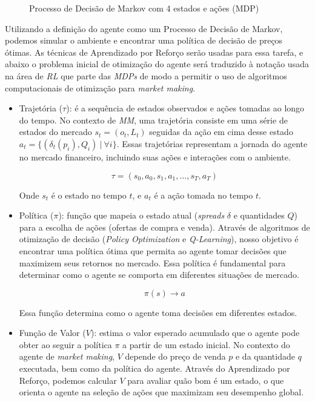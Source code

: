 \begin{figure}[H]
	\centering
	
	\caption{Processo de Decisão de Markov com 4 estados e ações (MDP)}
	\label{fig:mdp}
\end{figure}

Utilizando a definição do agente como um Processo de Decisão de Markov, podemos simular o ambiente e encontrar uma política de decisão de preços ótimas. As técnicas de Aprendizado por Reforço serão usadas para essa tarefa, e abaixo o problema inicial de otimização do agente será traduzido à notação usada na área de \textit{RL} que parte das \textit{MDPs} de modo a permitir o uso de algoritmos computacionais de otimização para \textit{market making}.


\begin{itemize}
	\item Trajetória ($\tau$): é a sequência de estados observados e ações tomadas ao longo do tempo. No contexto de \textit{MM}, uma trajetória consiste em uma série de estados do mercado $s_{t} = (o_{t}, L_{t})$ seguidas da ação em cima desse estado $a_{t} = \{(\delta_{t}(p_{i}), Q_{i}) \ | \ \forall i \}$. Essas trajetórias representam a jornada do agente no mercado financeiro, incluindo suas ações e interações com o ambiente.
	
	\[
	\tau = (s_0, a_0, s_1, a_1, \ldots, s_T, a_T)
	\]
	
	Onde \(s_t\) é o estado no tempo \(t\), e \(a_t\) é a ação tomada no tempo \(t\).
	
	\item Política ($\pi$): função que mapeia o estado atual (\textit{spreads} $\delta$ e quantidades $Q$) para a escolha de ações (ofertas de compra e venda). Através de algoritmos de otimização de decisão (\textit{Policy Optimization} e \textit{Q-Learning}), nosso objetivo é encontrar uma política ótima que permita ao agente tomar decisões que maximizem seus retornos no mercado. Essa política é fundamental para determinar como o agente se comporta em diferentes situações de mercado.
	
	\[
	\pi(s) \rightarrow a
	\]
	
	Essa função determina como o agente toma decisões em diferentes estados.
	
	\item Função de Valor ($V$): estima o valor esperado acumulado que o agente pode obter ao seguir a política \(\pi\) a partir de um estado inicial. No contexto do agente de \textit{market making}, $V$ depende do preço de venda $p$ e da quantidade $q$ executada, bem como da política do agente. Através do Aprendizado por Reforço, podemos calcular \(V\) para avaliar quão bom é um estado, o que orienta o agente na seleção de ações que maximizam seu desempenho global.
	

\end{itemize}
